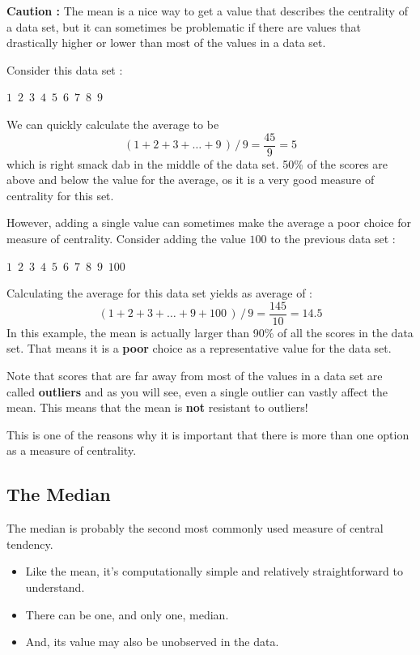 \documentclass[
  letterpaper,
  DIV=11,
  numbers=noendperiod]{scrreprt}
\begin{document}
\textbf{Caution :} The mean is a nice way to get a value that describes
the centrality of a data set, but it can sometimes be problematic if
there are values that drastically higher or lower than most of the
values in a data set.

Consider this data set :

\(1 \,\,\,2 \,\,\,3\,\,\,4\,\,\,5\,\,\,6\,\,\,7\,\,\,8\,\,\,9\)

We can quickly calculate the average to be
\[(1 + 2 + 3 + \dots +9\,)\,/\,9 = \frac{45}{9}=5\] which is right smack
dab in the middle of the data set. 50\% of the scores are above and
below the value for the average, os it is a very good measure of
centrality for this set.

However, adding a single value can sometimes make the average a poor
choice for measure of centrality. Consider adding the value \(100\) to
the previous data set :

\(1 \,\,\,2 \,\,\,3\,\,\,4\,\,\,5\,\,\,6\,\,\,7\,\,\,8\,\,\,9\,\,\,100\)

Calculating the average for this data set yields as average of :
\[(1 + 2 + 3 + \dots +9+100\,)\,/\,9 = \frac{145}{10} = 14.5\] In this
example, the mean is actually larger than 90\% of all the scores in the
data set. That means it is a \textbf{poor} choice as a representative
value for the data set.

Note that scores that are far away from most of the values in a data set
are called \textbf{outliers} and as you will see, even a single outlier
can vastly affect the mean. This means that the mean is \textbf{not}
resistant to outliers!

This is one of the reasons why it is important that there is more than
one option as a measure of centrality.

\subsection*{The Median}\label{the-median}

The median is probably the second most commonly used measure of central
tendency.

\begin{itemize}
\item
  Like the mean, it's computationally simple and relatively
  straightforward to understand.
\item
  There can be one, and only one, median.
\item
  And, its value may also be unobserved in the data.
\end{itemize}
\end{document}
